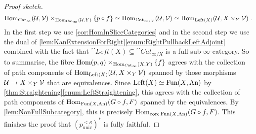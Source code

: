 \begin{proof}[Proof sketch]
\begin{equation*}
		\operatorname{Hom}_{\mathrm{Cat}_\infty}\!\left(\mathcal{U},\mathcal{V}\right)\times_{\operatorname{Hom}_{\mathrm{Cat}_\infty}(\mathcal{U},Y)}\{p\circ f\}\simeq \operatorname{Hom}_{\mathrm{Cat}_{\infty/Y}}\!\left(\mathcal{U},\mathcal{V}\right)\simeq \operatorname{Hom}_{\mathrm{Left}(X)}\!\left(\mathcal{U},X\times_Y\mathcal{V}\right)\,.
	\end{equation*}
	In the first step we use \cref{cor:HomInSliceCategories} and in the second step we use the dual of \cref{lem:KanExtensionForRight}\cref{enum:RightPullbackLeftAdjoint} combined with the fact that $\cat{Left}(X)\subseteq \cat{Cat}_{\infty/X}$ is a full sub-$\infty$-category. So to summarise, the fibre $\operatorname{Hom}(p,q)\times_{\operatorname{Hom}_{\mathrm{Cat}_\infty}(X,Y)}\{f\}$ agrees with the collection of path components of $\operatorname{Hom}_{\mathrm{Left}(X)}\!\left(\mathcal{U},X\times_Y\mathcal{V}\right)$ spanned by those morphisms $\mathcal{U}\rightarrow X\times_Y\mathcal{V}$ that are equivalences. Since $\mathrm{Left}(X)\simeq \operatorname{Fun}(X,\mathrm{An})$ by \cref{thm:Straightening}\cref{enum:LeftStraightening}, this agrees with the collection of path components of $\operatorname{Hom}_{\operatorname{Fun}(X,\mathrm{An})}(G\circ f,F)$ spanned by the equivalences. By \cref{lem:NonFullSubcategory}, this is precisely $\operatorname{Hom}_{\operatorname{core} \operatorname{Fun}(X,\mathrm{An})}\!\left(G\circ f,F\right)$. This finishes the proof that $(p_\mathrm{univ}^{<\kappa})^*$ is fully faithful.
\end{proof}
